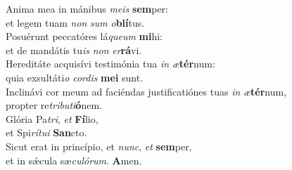 \oddverse Anima mea in mánibus \textit{me}\textit{is} \textbf{sem}per:~\*\\
\oddverse et legem tuam \textit{non} \textit{sum} \textit{o}\textbf{blí}tus.\\
\evenverse Posuérunt peccatóres lá\textit{que}\textit{um} \textbf{mi}hi:~\*\\
\evenverse et de mandátis tu\textit{is} \textit{non} \textit{er}\textbf{rá}vi.\\
\oddverse Hereditáte acquisívi testimónia tua \textit{in} \textit{æ}\textbf{tér}num:~\*\\
\oddverse quia exsultáti\textit{o} \textit{cor}\textit{dis} \textbf{me}\textbf{i} sunt.\\
\evenverse Inclinávi cor meum ad faciéndas justificatiónes tuas \textit{in} \textit{æ}\textbf{tér}num,~\*\\
\evenverse propter re\textit{tri}\textit{bu}\textit{ti}\textbf{ó}nem.\\
\oddverse Glória Pa\textit{tri}, \textit{et} \textbf{Fí}lio,~\*\\
\oddverse et Spi\textit{rí}\textit{tu}\textit{i} \textbf{San}cto.\\
\evenverse Sicut erat in princípio, et \textit{nunc}, \textit{et} \textbf{sem}per,~\*\\
\evenverse et in sǽcula sæ\textit{cu}\textit{ló}\textit{rum}. \textbf{A}men.\\
